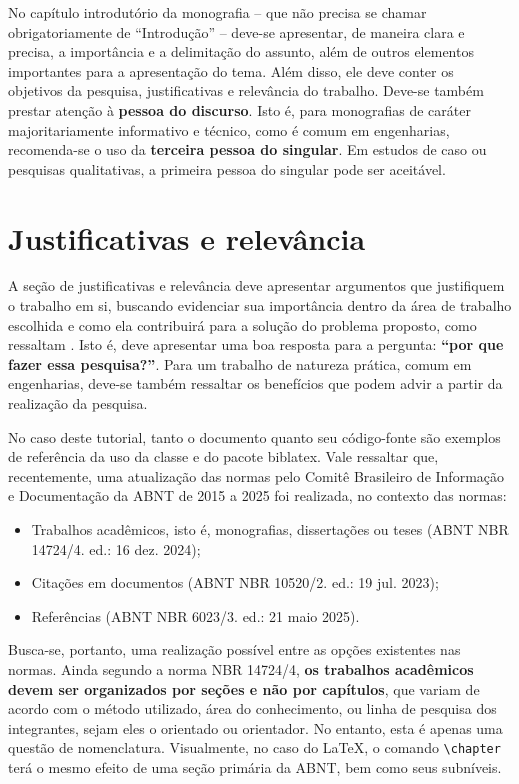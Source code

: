 \documentclass[
	12pt,				%
	openright,			%
	oneside,			%
	a4paper,			%
	english,			%
	brazil				%
	]{abntex2}
\begin{document}
	No capítulo introdutório da monografia -- que não precisa se chamar obrigatoriamente de ``Introdução'' -- deve-se apresentar, de maneira clara e precisa, a importância e a delimitação do assunto, além de outros elementos importantes para a apresentação do tema. Além disso, ele deve conter os objetivos da pesquisa, justificativas e relevância do trabalho. Deve-se também prestar atenção à \textbf{pessoa do discurso}. Isto é, para monografias de caráter majoritariamente informativo e técnico, como é comum em engenharias, recomenda-se o uso da \textbf{terceira pessoa do singular}. Em estudos de caso ou pesquisas qualitativas, a primeira pessoa do singular pode ser aceitável.

\section{Justificativas e relevância}
	A seção de justificativas e relevância deve apresentar argumentos que justifiquem o trabalho em si, buscando evidenciar sua importância dentro da área de trabalho escolhida e como ela contribuirá para a solução do problema proposto, como ressaltam \textcite{fuchs2025guia}. Isto é, deve apresentar uma boa resposta para a pergunta: \textbf{``por que fazer essa pesquisa?''}.  Para um trabalho de natureza prática, comum em engenharias, deve-se também ressaltar os benefícios que podem advir a partir da realização da pesquisa. 
	
	No caso deste tutorial, tanto o documento quanto seu código-fonte são exemplos de referência da uso da classe \textsf{\abnTeX} e do pacote \textsf{biblatex}. Vale ressaltar que, recentemente, uma atualização das normas pelo Comitê Brasileiro de Informação e Documentação da ABNT de 2015 a 2025 foi realizada, no contexto das normas:
	
	\begin{itemize}
		\item[a)] Trabalhos acadêmicos, isto é, monografias, dissertações ou teses (ABNT NBR 14724/4. ed.: 16 dez. 2024);
		\item[b)] Citações em documentos (ABNT NBR 10520/2. ed.: 19 jul. 2023);
		\item[c)] Referências (ABNT NBR 6023/3. ed.: 21 maio 2025). 
	\end{itemize}
	  
	Busca-se, portanto, uma realização possível entre as opções existentes nas normas. Ainda segundo a norma NBR 14724/4, \textbf{os trabalhos acadêmicos devem ser organizados por seções e não por capítulos}, que variam de acordo com o método utilizado, área do conhecimento, ou linha de pesquisa dos integrantes, sejam eles o orientado ou orientador. No entanto, esta é apenas uma questão de nomenclatura. Visualmente, no caso do \LaTeX, o comando \verb*|\chapter| terá o mesmo efeito de uma seção primária da ABNT, bem como seus subníveis. 
\end{document}
